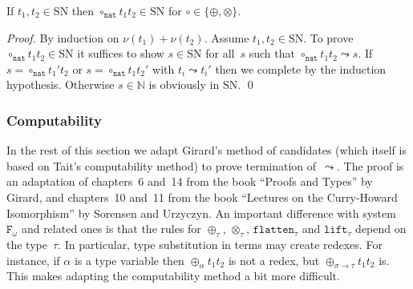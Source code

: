 \documentclass[runningheads,a4paper]{llncs}
\newcommand{\Fomega}{\mathtt{F}_\omega}
\newcommand{\arrtype}{\rightarrow}
\newcommand{\nat}{\mathtt{nat}}
\newcommand{\flatten}{\mathtt{flatten}}
\newcommand{\lift}{\mathtt{lift}}
\newcommand{\SN}{\mathrm{SN}}
\begin{document}
\begin{lemma}\label{lem_circ_sn_base}
  If $t_1,t_2 \in \SN$ then $\circ_\nat t_1 t_2 \in \SN$ for $\circ
  \in \{\oplus,\otimes\}$.
\end{lemma}

\begin{proof}
  By induction on $\nu(t_1) + \nu(t_2)$. Assume $t_1,t_2 \in \SN$. To
  prove $\circ_\nat t_1 t_2 \in \SN$ it suffices to show $s \in \SN$
  for all~$s$ such that $\circ_\nat t_1 t_2 \leadsto s$. If $s =
  \circ_\nat t_1' t_2$ or $s = \circ_\nat t_1 t_2'$ with $t_i \leadsto
  t_i'$ then we complete by the induction hypothesis. Otherwise $s \in
  \mathbb{N}$ is obviously in $\SN$.  \qed
\end{proof}

\subsubsection{Computability}

In the rest of this section we adapt Girard's method of candidates
(which itself is based on Tait's computability method) to prove
termination of~$\leadsto$. The proof is an adaptation of chapters~6
and~14 from the book ``Proofs and Types'' by Girard, and chapters~10
and~11 from the book ``Lectures on the Curry-Howard Isomorphism'' by
Sorensen and Urzyczyn. An important difference with system~$\Fomega$
and related ones is that the rules for $\oplus_\tau$, $\otimes_\tau$,
$\flatten_\tau$ and $\lift_\tau$ depend on the type~$\tau$. In
particular, type substitution in terms may create redexes. For
instance, if $\alpha$ is a type variable then $\oplus_\alpha t_1 t_2$
is not a redex, but $\oplus_{\sigma\arrtype\tau} t_1 t_2$ is. This
makes adapting the computability method a bit more difficult.
\end{document}

